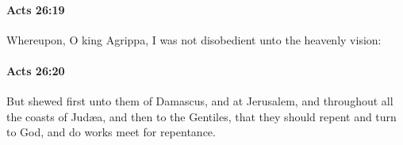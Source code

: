 		\paragraph{Acts 26:19} %
			\label{ACTS-26-19}

			Whereupon, O king Agrippa, I was not disobedient unto the heavenly vision:

			\begin{framed}
			\scriptsize
				\begin{compactdesc}
					\item[SBLG] 
				\end{compactdesc}
			\end{framed}

		\paragraph{Acts 26:20} %
			\label{ACTS-26-20}

			But shewed first unto them of Damascus, and at Jerusalem, and throughout all the coasts of Judæa, and then to the Gentiles, that they should repent and turn to God, and do works meet for repentance.

